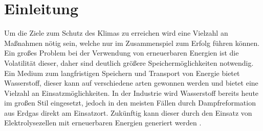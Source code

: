 \chapter{Einleitung}
Um die Ziele zum Schutz des Klimas zu erreichen wird eine Vielzahl an Maßnahmen nötig sein, welche nur im Zusammenspiel zum Erfolg führen können. Ein großes Problem bei der Verwendung von erneuerbaren Energien ist die Volatilität dieser, daher sind deutlich größere Speichermöglichkeiten notwendig. Ein Medium zum langfristigen Speichern und Transport von Energie bietet Wasserstoff, dieser kann auf verschiedene arten gewonnen werden und bietet eine Vielzahl an Einsatzmöglichkeiten. In der Industrie wird Wasserstoff bereits heute im großen Stil eingesetzt, jedoch in den meisten Fällen durch Dampfreformation aus Erdgas direkt am Einsatzort. Zukünftig kann dieser durch den Einsatz von Elektrolysezellen mit erneuerbaren Energien generiert werden \cite{Elektrolyse} . 




